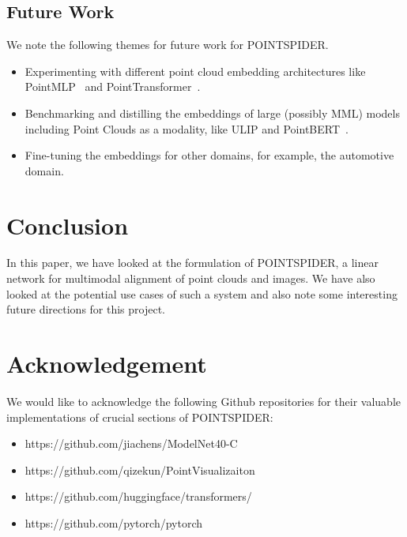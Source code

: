 \documentclass[letterpaper, 10 pt, conference]{ieeeconf}  %
\begin{document}
\subsection{Future Work}
We note the following themes for future work for POINTSPIDER.
\begin{itemize}
    \item Experimenting with different point cloud embedding architectures like PointMLP~\cite{ma2022rethinking} and PointTransformer~\cite{Zhao_2021_ICCV}.
    \item Benchmarking and distilling the embeddings of large (possibly MML) models including Point Clouds as a modality, like ULIP and PointBERT~\cite{Yu_2022_CVPR}.
    \item Fine-tuning the embeddings for other domains, for example, the automotive domain.
\end{itemize}

\section{Conclusion}
\label{conclusion}
In this paper, we have looked at the formulation of POINTSPIDER, a linear network for multimodal alignment of point clouds and images. We have also looked at the potential use cases of such a system and also note some interesting future directions for this project.

\section{Acknowledgement}
\label{ack}
We would like to acknowledge the following Github repositories for their valuable implementations of crucial sections of POINTSPIDER:
\begin{itemize}
    \item https://github.com/jiachens/ModelNet40-C
    \item https://github.com/qizekun/PointVisualizaiton
    \item https://github.com/huggingface/transformers/
    \item https://github.com/pytorch/pytorch
\end{itemize}

\balance



\end{document}
